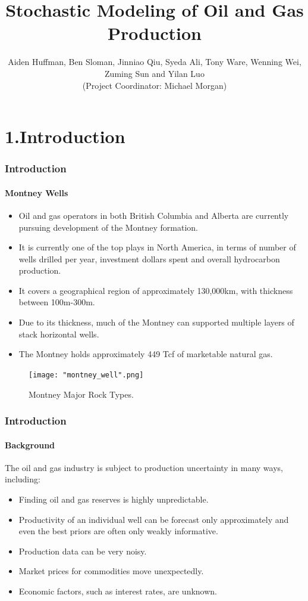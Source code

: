 \documentclass[11pt]{beamer}
\author{Aiden Huffman, Ben Sloman, Jinniao Qiu, Syeda Ali, Tony Ware, Wenning Wei, Zuming Sun and Yilan Luo\\
 (Project Coordinator: Michael Morgan)
}
\title{Stochastic Modeling of Oil and Gas Production
}
\begin{document}
\upshape
\maketitle
\begin{frame}
	\tableofcontents
\end{frame}


\section{1.Introduction}

\begin{frame}
	\frametitle{Introduction}
	\framesubtitle{Montney Wells}
	\justifying
	\begin{itemize}
		\item Oil and gas operators in both British Columbia and Alberta are currently pursuing development of the Montney formation.
		\item It is currently one of the top plays in North America, in terms of number of wells drilled per year, investment dollars spent and overall hydrocarbon production.
		\item It covers a geographical region of approximately 130,000km, with thickness between 100m-300m.
		\item Due to its thickness, much of the Montney can supported multiple layers of stack horizontal wells.
		\item The Montney holds approximately 449 Tcf of marketable natural gas.
	\end{itemize}
\end{frame}


\begin{frame}
	\begin{figure}
		\begin{center}
			\texttt{[image: "montney\_well".png]} 
			\caption{Montney Major Rock Types.}
			\label{smooth}
		\end{center}
	\end{figure}
\end{frame}	
	
	
\begin{frame}
	\frametitle{Introduction}
	\framesubtitle{Background}
	The oil and gas industry is subject to production uncertainty in many ways, including:
	\begin{itemize}
		\item Finding oil and gas reserves is highly unpredictable.
		\item Productivity of an individual well can be forecast only approximately and even the best priors are often only weakly informative.
		\item Production data can be very noisy.
		\item Market prices for commodities move unexpectedly.
		\item Economic factors, such as interest rates, are unknown.
	\end{itemize}
\end{frame}
\end{document}
